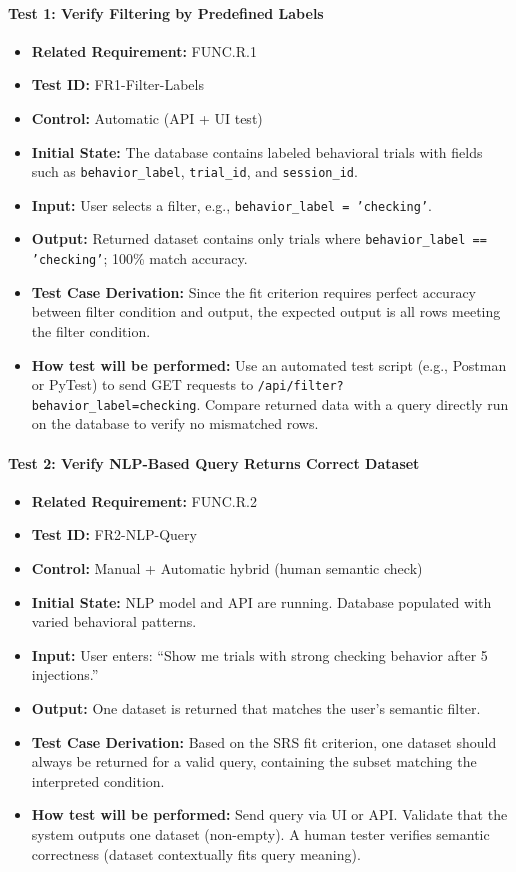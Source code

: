 \documentclass[12pt, titlepage]{article}
\begin{document}
\paragraph{Test 1: Verify Filtering by Predefined Labels}
\begin{itemize}
    \item \textbf{Related Requirement:} FUNC.R.1
    \item \textbf{Test ID:} FR1-Filter-Labels
    \item \textbf{Control:} Automatic (API + UI test)
    \item \textbf{Initial State:} The database contains labeled behavioral trials with fields such as \texttt{behavior\_label}, \texttt{trial\_id}, and \texttt{session\_id}.
    \item \textbf{Input:} User selects a filter, e.g., \texttt{behavior\_label = 'checking'}.
    \item \textbf{Output:} Returned dataset contains only trials where \texttt{behavior\_label == 'checking'}; 100\% match accuracy.
    \item \textbf{Test Case Derivation:} Since the fit criterion requires perfect accuracy between filter condition and output, the expected output is all rows meeting the filter condition.
    \item \textbf{How test will be performed:} Use an automated test script (e.g., Postman or PyTest) to send GET requests to \texttt{/api/filter?behavior\_label=checking}. Compare returned data with a query directly run on the database to verify no mismatched rows.
\end{itemize}

\paragraph{Test 2: Verify NLP-Based Query Returns Correct Dataset}
\begin{itemize}
    \item \textbf{Related Requirement:} FUNC.R.2
    \item \textbf{Test ID:} FR2-NLP-Query
    \item \textbf{Control:} Manual + Automatic hybrid (human semantic check)
    \item \textbf{Initial State:} NLP model and API are running. Database populated with varied behavioral patterns.
    \item \textbf{Input:} User enters: ``Show me trials with strong checking behavior after 5 injections.''
    \item \textbf{Output:} One dataset is returned that matches the user's semantic filter.
    \item \textbf{Test Case Derivation:} Based on the SRS fit criterion, one dataset should always be returned for a valid query, containing the subset matching the interpreted condition.
    \item \textbf{How test will be performed:} Send query via UI or API. Validate that the system outputs one dataset (non-empty). A human tester verifies semantic correctness (dataset contextually fits query meaning).
\end{itemize}
\end{document}
